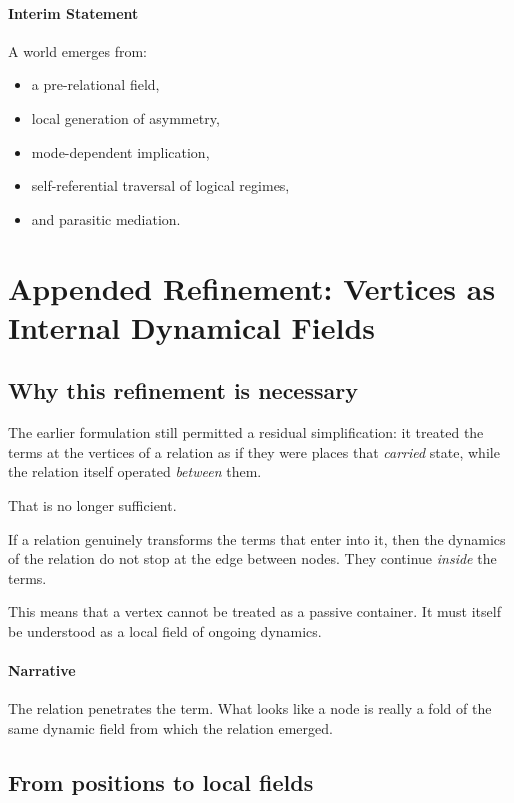 \documentclass[11pt]{article}
\begin{document}
\paragraph{Interim Statement}
A world emerges from:
\begin{itemize}
\item a pre-relational field,
\item local generation of asymmetry,
\item mode-dependent implication,
\item self-referential traversal of logical regimes,
\item and parasitic mediation.
\end{itemize}

\appendix

\section{Appended Refinement: Vertices as Internal Dynamical Fields}

\subsection*{Why this refinement is necessary}

The earlier formulation still permitted a residual simplification:
it treated the terms at the vertices of a relation as if they were places that
\emph{carried} state, while the relation itself operated \emph{between} them.

That is no longer sufficient.

If a relation genuinely transforms the terms that enter into it, then the
dynamics of the relation do not stop at the edge between nodes.
They continue \emph{inside} the terms.

This means that a vertex cannot be treated as a passive container.
It must itself be understood as a local field of ongoing dynamics.

\paragraph{Narrative}
The relation penetrates the term.
What looks like a node is really a fold of the same dynamic field from which the relation emerged.

\subsection*{From positions to local fields}
\end{document}
